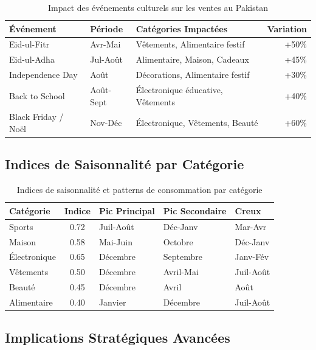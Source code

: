 \documentclass[a4paper,12pt]{article}
\begin{document}
\begin{table}[H]
\centering
\caption{Impact des événements culturels sur les ventes au Pakistan}
\label{tab:event_culturel}
\begin{tabular}{|l|l|l|r|}
\hline
\textbf{Événement} & \textbf{Période} & \textbf{Catégories Impactées} & \textbf{Variation} \\ \hline
Eid-ul-Fitr & Avr-Mai & Vêtements, Alimentaire festif & +50\% \\ \hline
Eid-ul-Adha & Jul-Août & Alimentaire, Maison, Cadeaux & +45\% \\ \hline
Independence Day & Août & Décorations, Alimentaire festif & +30\% \\ \hline
Back to School & Août-Sept & Électronique éducative, Vêtements & +40\% \\ \hline
Black Friday / Noël & Nov-Déc & Électronique, Vêtements, Beauté & +60\% \\ \hline
\end{tabular}
\end{table}

\subsection{Indices de Saisonnalité par Catégorie}

\begin{table}[H]
\centering
\caption{Indices de saisonnalité et patterns de consommation par catégorie}
\label{tab:saisonnalite_categorie}
\begin{tabular}{|l|c|l|l|l|}
\hline
\textbf{Catégorie} & \textbf{Indice} & \textbf{Pic Principal} & \textbf{Pic Secondaire} & \textbf{Creux} \\ \hline
Sports & 0.72 & Juil-Août & Déc-Janv & Mar-Avr \\ \hline
Maison & 0.58 & Mai-Juin & Octobre & Déc-Janv \\ \hline
Électronique & 0.65 & Décembre & Septembre & Janv-Fév \\ \hline
Vêtements & 0.50 & Décembre & Avril-Mai & Juil-Août \\ \hline
Beauté & 0.45 & Décembre & Avril & Août \\ \hline
Alimentaire & 0.40 & Janvier & Décembre & Juil-Août \\ \hline
\end{tabular}
\end{table}

\subsection{Implications Stratégiques Avancées}
\end{document}
